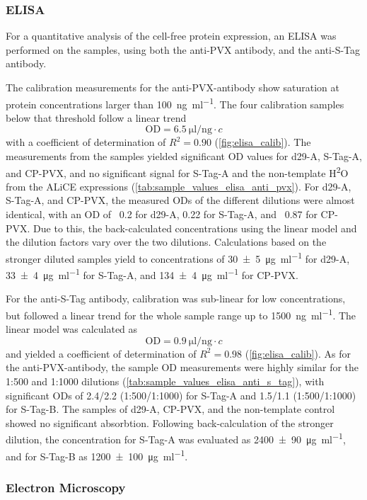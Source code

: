 \subsubsection{ELISA}
For a quantitative analysis of the cell-free protein expression, an ELISA was performed on the samples, using both the anti-PVX antibody, and the anti-S-Tag antibody. 

The calibration measurements for the anti-PVX-antibody show saturation at protein concentrations larger than \SI{100}{\nano\gram\per\milli\litre}. The four calibration samples below that threshold follow a linear trend 
\begin{equation}
\text{OD} = \SI{6.5}{\micro\litre\per\nano\gram} \cdot c
\end{equation}
with a coefficient of determination of $R^2=0.90$ (\autoref{fig:elisa_calib}). The measurements from the samples yielded significant OD values for d29-A, S-Tag-A, and CP-PVX, and no significant signal for S-Tag-A and the non-template H\textsuperscript{2}O from the ALiCE expressions (\autoref{tab:sample_values_elisa_anti_pvx}). For d29-A, S-Tag-A, and CP-PVX, the measured ODs of the different dilutions were almost identical, with an OD of ~0.2 for d29-A, 0.22 for S-Tag-A, and ~0.87 for CP-PVX. Due to this, the back-calculated concentrations using the linear model and the dilution factors vary over the two dilutions. Calculations based on the stronger diluted samples yield to concentrations of \SI{30\pm 5}{\micro\gram\per\milli\litre} for d29-A, \SI{33\pm 4}{\micro\gram\per\milli\litre} for S-Tag-A, and \SI{134\pm 4}{\micro\gram\per\milli\litre} for CP-PVX. 

For the anti-S-Tag antibody, calibration was sub-linear for low concentrations, but followed a linear trend for the whole sample range up to \SI{1500}{\nano\gram\per\milli\litre}. The linear model was calculated as 
\begin{equation}
\text{OD} = \SI{0.9}{\micro\litre\per\nano\gram} \cdot c
\end{equation}
and yielded a coefficient of determination of $R^2 = 0.98$ (\autoref{fig:elisa_calib}). As for the anti-PVX-antibody, the sample OD measurements were highly similar for the 1:500 and 1:1000 dilutions (\autoref{tab:sample_values_elisa_anti_s_tag}), with significant ODs of 2.4/2.2 (1:500/1:1000)  for S-Tag-A and 1.5/1.1 (1:500/1:1000) for S-Tag-B. The samples of d29-A, CP-PVX, and the non-template control showed no significant absorbtion. Following back-calculation of the stronger dilution, the concentration for S-Tag-A was evaluated as \SI{2400\pm 90}{\micro\gram\per\milli\litre}, and for S-Tag-B as \SI{1200\pm 100}{\micro\gram\per\milli\litre}.

\subsubsection{Electron Microscopy}